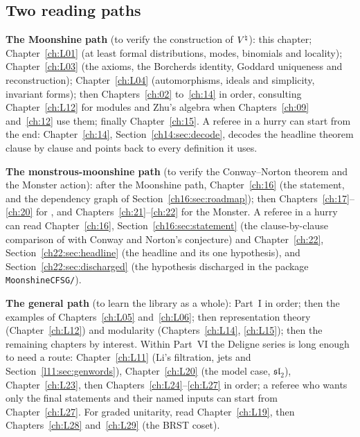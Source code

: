 \subsection{Two reading paths}\label{ch01:sec:paths}

\textbf{The Moonshine path} (to verify the construction of ${V^{\natural}}$): this chapter;
Chapter~\ref{ch:L01} (at least formal distributions, modes, binomials and locality);
Chapter~\ref{ch:L03} (the axioms, the Borcherds identity, Goddard uniqueness and reconstruction);
Chapter~\ref{ch:L04} (automorphisms, ideals and simplicity, invariant forms); then
Chapters~\ref{ch:02} to~\ref{ch:14} in order, consulting Chapter~\ref{ch:L12} for modules and Zhu's
algebra when Chapters~\ref{ch:09} and~\ref{ch:12} use them; finally Chapter~\ref{ch:15}. A referee in
a hurry can start from the end: Chapter~\ref{ch:14}, Section~\ref{ch14:sec:decode}, decodes the
headline theorem clause by clause and points back to every definition it uses.

\textbf{The monstrous-moonshine path} (to verify the Conway--Norton theorem and the Monster action): after the
Moonshine path, Chapter~\ref{ch:16} (the statement, and the dependency graph of Section~\ref{ch16:sec:roadmap}); then
Chapters~\ref{ch:17}--\ref{ch:20} for , and Chapters~\ref{ch:21}--\ref{ch:22} for the Monster. A
referee in a hurry can read Chapter~\ref{ch:16}, Section~\ref{ch16:sec:statement} (the clause-by-clause comparison of
 with Conway and Norton's conjecture) and Chapter~\ref{ch:22},
Section~\ref{ch22:sec:headline} (the headline and its one hypothesis), and Section~\ref{ch22:sec:discharged} (the
hypothesis discharged in the package \texttt{MoonshineCFSG/}).

\textbf{The general path} (to learn the library as a whole): Part~I in order; then the examples of
Chapters~\ref{ch:L05} and~\ref{ch:L06}; then representation theory (Chapter~\ref{ch:L12}) and
modularity (Chapters~\ref{ch:L14}, \ref{ch:L15}); then the remaining chapters by interest.
Within Part~VI the Deligne series is long enough to need a route: Chapter~\ref{ch:L11}
(Li's filtration, jets and Section~\ref{l11:sec:genwords}), Chapter~\ref{ch:L20} (the model case,
$\mathfrak{sl}_2$), Chapter~\ref{ch:L23}, then Chapters~\ref{ch:L24}--\ref{ch:L27} in order; a referee who
wants only the final statements and their named inputs can start from Chapter~\ref{ch:L27}. For graded
unitarity, read Chapter~\ref{ch:L19}, then Chapters~\ref{ch:L28} and~\ref{ch:L29} (the BRST coset).

